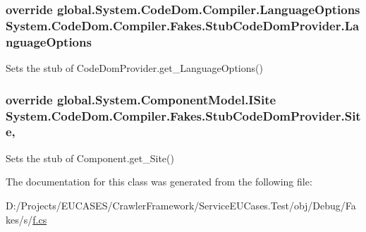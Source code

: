 \hypertarget{class_system_1_1_code_dom_1_1_compiler_1_1_fakes_1_1_stub_code_dom_provider_a3905a9e7990c062709aca6081b9997e6}{
\subsubsection[{Language\-Options}]{\setlength{\rightskip}{0pt plus 5cm}override global.\-System.\-Code\-Dom.\-Compiler.\-Language\-Options System.\-Code\-Dom.\-Compiler.\-Fakes.\-Stub\-Code\-Dom\-Provider.\-Language\-Options\hspace{0.3cm}{\ttfamily [get]}}}\label{class_system_1_1_code_dom_1_1_compiler_1_1_fakes_1_1_stub_code_dom_provider_a3905a9e7990c062709aca6081b9997e6}


Sets the stub of Code\-Dom\-Provider.\-get\-\_\-\-Language\-Options()

\hypertarget{class_system_1_1_code_dom_1_1_compiler_1_1_fakes_1_1_stub_code_dom_provider_a78c3b0432eff0242c630a8b2aaf47242}{
\subsubsection[{Site}]{\setlength{\rightskip}{0pt plus 5cm}override global.\-System.\-Component\-Model.\-I\-Site System.\-Code\-Dom.\-Compiler.\-Fakes.\-Stub\-Code\-Dom\-Provider.\-Site\hspace{0.3cm}{\ttfamily [get]}, {\ttfamily [set]}}}\label{class_system_1_1_code_dom_1_1_compiler_1_1_fakes_1_1_stub_code_dom_provider_a78c3b0432eff0242c630a8b2aaf47242}


Sets the stub of Component.\-get\-\_\-\-Site()



The documentation for this class was generated from the following file\-:\begin{DoxyCompactItemize}
\item 
D\-:/\-Projects/\-E\-U\-C\-A\-S\-E\-S/\-Crawler\-Framework/\-Service\-E\-U\-Cases.\-Test/obj/\-Debug/\-Fakes/s/\hyperlink{s_2f_8cs}{f.\-cs}\end{DoxyCompactItemize}
